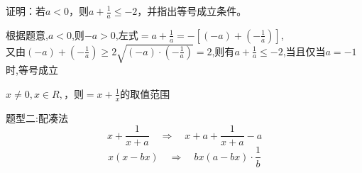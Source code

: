 \documentclass[10pt,a4paper]{ctexbook}
\begin{document}
\par
\begin{problem}
    证明：若$ a<0$，则$\displaystyle a+\frac{1}{a} \le -2$，并指出等号成立条件。
    \begin{jiexi}
       根据题意,$a<0$,则$-a>0$,左式$\displaystyle =a+\frac{1}{a}=-[(-a)+(-\frac{1}{a})]$,\\
       又由$\displaystyle (-a)+(-\frac{1}{a})\ge 2\sqrt{(-a)\cdot(-\frac{1}{a})} = 2$,则有$a+\frac{1}{a}\le -2$,当且仅当$a=-1$时,等号成立
    \end{jiexi}
\end{problem}

\par
\begin{problem}
    $x \ne 0,x\in R,$，则$\displaystyle =x+\frac{1}{x}$的取值范围\tiankong{$(-\infty,-2]\cup[2,+\infty)$}
\end{problem}



\begin{tcolorbox} 
题型二:配凑法
\tcblower %
$$x+\frac{1}{x+a} \quad \Rightarrow \quad x+a+\frac{1}{x+a}-a$$
$$x(x-bx) \quad \Rightarrow \quad bx(a-bx)\cdot \frac{1}{b} $$
\end{tcolorbox}
\end{document}
